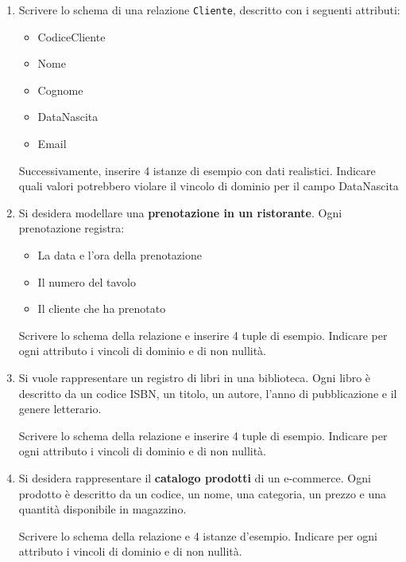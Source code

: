 \documentclass[a4paper,12pt]{article}
\begin{document}
\begin{enumerate}
\item 

Scrivere lo schema di una relazione \texttt{Cliente}, descritto con i seguenti attributi:
\begin{itemize}
    \item CodiceCliente
    \item Nome
    \item Cognome
    \item DataNascita
    \item Email
\end{itemize}

Successivamente, inserire 4 istanze di esempio con dati realistici.  
Indicare quali valori potrebbero violare il vincolo di dominio per il campo DataNascita

\vspace{0.5cm}

\item
Si desidera modellare una \textbf{prenotazione in un ristorante}. Ogni prenotazione registra:
\begin{itemize}
    \item La data e l’ora della prenotazione
    \item Il numero del tavolo
    \item Il cliente che ha prenotato
\end{itemize}

Scrivere lo schema della relazione e inserire 4 tuple di esempio. Indicare per ogni attributo i vincoli di dominio e di non nullità.

\vspace{0.5cm}

\item 

Si vuole rappresentare un registro di libri in una biblioteca. Ogni libro è descritto da un codice ISBN, un titolo, un autore, l’anno di pubblicazione e il genere letterario.  

Scrivere lo schema della relazione e inserire 4 tuple di esempio. Indicare per ogni attributo i vincoli di dominio e di non nullità.

\vspace{0.5cm}  


\item
Si desidera rappresentare il \textbf{catalogo prodotti} di un e-commerce. Ogni prodotto è descritto da un codice, un nome, una categoria, un prezzo e una quantità disponibile in magazzino.

Scrivere lo schema della relazione e 4 istanze d'esempio. Indicare per ogni attributo i vincoli di dominio e di non nullità.


\end{enumerate}
\end{document}
